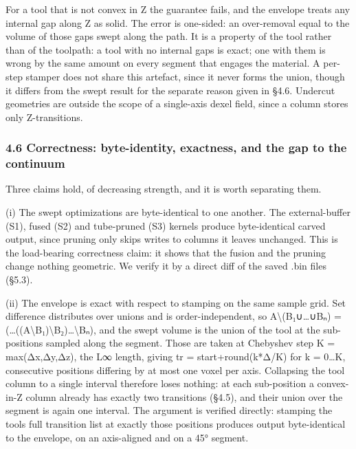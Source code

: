 \documentclass[
]{article}
\begin{document}
For a tool that is not convex in Z the guarantee fails, and the envelope
treats any internal gap along Z as solid. The error is one-sided: an
over-removal equal to the volume of those gaps swept along the path. It
is a property of the tool rather than of the toolpath: a tool with no
internal gaps is exact; one with them is wrong by the same amount on
every segment that engages the material. A per-step stamper does not
share this artefact, since it never forms the union, though it differs
from the swept result for the separate reason given in §4.6. Undercut
geometries are outside the scope of a single-axis dexel field, since a
column stores only Z-transitions.

\hypertarget{correctness-byte-identity-exactness-and-the-gap-to-the-continuum}{%
\subsubsection{4.6 Correctness: byte-identity, exactness, and the gap to
the
continuum}\label{correctness-byte-identity-exactness-and-the-gap-to-the-continuum}}

Three claims hold, of decreasing strength, and it is worth separating
them.

(i) The swept optimizations are byte-identical to one another. The
external-buffer (S1), fused (S2) and tube-pruned (S3) kernels produce
byte-identical carved output, since pruning only skips writes to columns
it leaves unchanged. This is the load-bearing correctness claim: it
shows that the fusion and the pruning change nothing geometric. We
verify it by a direct diff of the saved .bin files (§5.3).

(ii) The envelope is exact with respect to stamping on the same sample
grid. Set difference distributes over unions and is order-independent,
so A\textbackslash(B₁∪\ldots∪Bₙ) =
(\ldots((A\textbackslash B₁)\textbackslash B₂)\ldots\textbackslash Bₙ),
and the swept volume is the union of the tool at the sub-positions
sampled along the segment. Those are taken at Chebyshev step K =
max(\textbar Δx\textbar,\textbar Δy\textbar,\textbar Δz\textbar), the L∞
length, giving tr = start+round(k*Δ/K) for k = 0\ldots K, consecutive
positions differing by at most one voxel per axis. Collapsing the tool
column to a single interval therefore loses nothing: at each
sub-position a convex-in-Z column already has exactly two transitions
(§4.5), and their union over the segment is again one interval. The
argument is verified directly: stamping the tool\textquotesingle s full
transition list at exactly those positions produces output
byte-identical to the envelope, on an axis-aligned and on a 45° segment.
\end{document}
